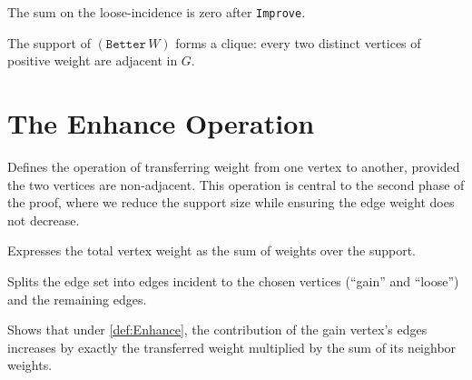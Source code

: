 \begin{lemma}\label{lem:Improve_loose_contribution_zero}
The sum on the loose-incidence is zero after \texttt{Improve}.
\end{lemma}

\begin{theorem}\label{thm:Better_forms_clique}
The support of $(\texttt{Better}\,W)$ forms a clique: every two distinct vertices of positive weight are adjacent in $G$.
\end{theorem}


\section{The Enhance Operation}

\begin{definition}[Enhance]
  \label{def:Enhance}
  \leanok
  Defines the operation of transferring weight from one vertex to another,
  provided the two vertices are non-adjacent. This operation is central to the
  second phase of the proof, where we reduce the support size while ensuring
  the edge weight does not decrease.
\end{definition}

\begin{lemma}
  \label{lem:sum_over_support}
  \leanok
  Expresses the total vertex weight as the sum of weights over the support.
\end{lemma}

\begin{lemma}
  \label{lem:supported_edge_partition}
  \leanok
  Splits the edge set into edges incident to the chosen vertices (“gain” and “loose”)
  and the remaining edges.
\end{lemma}

\begin{lemma}
  \label{lem:Enhance_gain_sum}
  \leanok
  Shows that under \ref{def:Enhance}, the contribution of the gain vertex’s edges
  increases by exactly the transferred weight multiplied by the sum of its neighbor weights.
\end{lemma}


